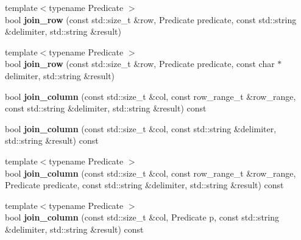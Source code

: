 \begin{DoxyCompactItemize}
\item 
\hypertarget{classstrtk_1_1token__grid_a3dc5abf59a0dafb488d23ef5375e79de}{{\footnotesize template$<$typename Predicate $>$ }\\bool {\bfseries join\-\_\-row} (const std\-::size\-\_\-t \&row, Predicate predicate, const std\-::string \&delimiter, std\-::string \&result)}\label{classstrtk_1_1token__grid_a3dc5abf59a0dafb488d23ef5375e79de}

\item 
\hypertarget{classstrtk_1_1token__grid_ab4b10b683f628c782a0c7157a98961a7}{{\footnotesize template$<$typename Predicate $>$ }\\bool {\bfseries join\-\_\-row} (const std\-::size\-\_\-t \&row, Predicate predicate, const char $\ast$delimiter, std\-::string \&result)}\label{classstrtk_1_1token__grid_ab4b10b683f628c782a0c7157a98961a7}

\item 
\hypertarget{classstrtk_1_1token__grid_ad3b01cc1f22de77f8619e36fc303663b}{bool {\bfseries join\-\_\-column} (const std\-::size\-\_\-t \&col, const row\-\_\-range\-\_\-t \&row\-\_\-range, const std\-::string \&delimiter, std\-::string \&result) const }\label{classstrtk_1_1token__grid_ad3b01cc1f22de77f8619e36fc303663b}

\item 
\hypertarget{classstrtk_1_1token__grid_a54264f824fc72ef155d6894f4b7758f3}{bool {\bfseries join\-\_\-column} (const std\-::size\-\_\-t \&col, const std\-::string \&delimiter, std\-::string \&result) const }\label{classstrtk_1_1token__grid_a54264f824fc72ef155d6894f4b7758f3}

\item 
\hypertarget{classstrtk_1_1token__grid_a7037ecbd121044e985e8d2ec808567ce}{{\footnotesize template$<$typename Predicate $>$ }\\bool {\bfseries join\-\_\-column} (const std\-::size\-\_\-t \&col, const row\-\_\-range\-\_\-t \&row\-\_\-range, Predicate predicate, const std\-::string \&delimiter, std\-::string \&result) const }\label{classstrtk_1_1token__grid_a7037ecbd121044e985e8d2ec808567ce}

\item 
\hypertarget{classstrtk_1_1token__grid_a7d8b1f17b565704cebd55b0f7e449229}{{\footnotesize template$<$typename Predicate $>$ }\\bool {\bfseries join\-\_\-column} (const std\-::size\-\_\-t \&col, Predicate p, const std\-::string \&delimiter, std\-::string \&result) const }\label{classstrtk_1_1token__grid_a7d8b1f17b565704cebd55b0f7e449229}


\end{DoxyCompactItemize}
